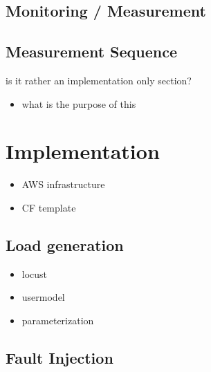 \subsection{Monitoring / Measurement}


\subsection{Measurement Sequence}

is it rather an implementation only section?

\begin{itemize}
	\item what is the purpose of this
\end{itemize}

\section{Implementation}

\begin{itemize}
	\item AWS infrastructure
	\item CF template
\end{itemize}

\subsection{Load generation}

\begin{itemize}
	\item locust
	\item usermodel
	\item parameterization
\end{itemize}

\subsection{Fault Injection}

